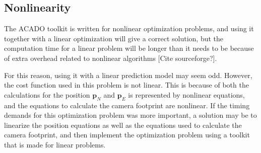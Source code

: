 \subsection{Nonlinearity}

The ACADO toolkit is written for nonlinear optimization problems, and using it together with a linear optimization will give a correct solution, but the computation time for a linear problem will be longer than it needs to be because of extra overhead related to nonlinear algorithms [Cite sourceforge?].

For this reason, using it with a linear prediction model may seem odd. However, the cost function used in this problem is not linear. This is because of both the calculations for the position $\mathbf{p}_N$ and $\mathbf{p}_E$ is represented by nonlinear equations, and the equations to calculate the camera footprint are nonlinear. If the timing demands for this optimization problem was more important, a solution may be to linearize the position equations as well as the equations used to calculate the camera footprint, and then implement the optimization problem using a toolkit that is made for linear problems.